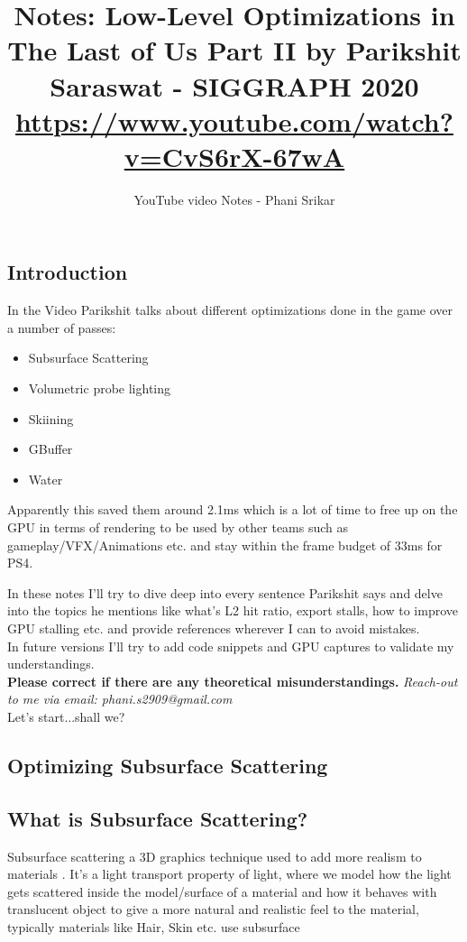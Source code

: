 \documentclass[14pt]{article}
\begin{document}
\title{Notes: Low-Level Optimizations in The Last of Us Part II by Parikshit Saraswat - SIGGRAPH 2020 \\
\large \url{https://www.youtube.com/watch?v=CvS6rX-67wA}
}
\author{YouTube video Notes - Phani Srikar}
\maketitle

\subsection*{Introduction}
	In the Video Parikshit talks about different optimizations done in the game over a number of passes:
	\begin{itemize}
		\item Subsurface Scattering
		\item Volumetric probe lighting
		\item Skiining
		\item GBuffer
		\item Water
	\end{itemize}
Apparently this saved them around 2.1ms which is a lot of time to free up on the GPU in terms of rendering to be used by other teams such as gameplay/VFX/Animations etc. and stay within the frame budget of 33ms for PS4.

In these notes I'll try to dive deep into every sentence Parikshit says and delve into the topics he mentions like what's L2 hit ratio, export stalls, how to improve GPU stalling etc. and provide references wherever I can to avoid mistakes. \\  

In future versions I'll try to add code snippets and GPU captures to validate my understandings. \\

\textbf{Please correct if there are any theoretical misunderstandings.}
\textit{Reach-out to me via email: phani.s2909@gmail.com} \\

Let's start...shall we?


\subsection*{Optimizing Subsurface Scattering}
\subsection*{What is Subsurface Scattering?} 
Subsurface scattering a 3D graphics technique used to add more realism to materials \cite{sss}. It's a light transport property of light, where we model how the light gets scattered inside the model/surface of a material and how it behaves with translucent object to give a more natural and realistic feel to the material, typically materials like Hair, Skin etc. use subsurface 
\end{document}
